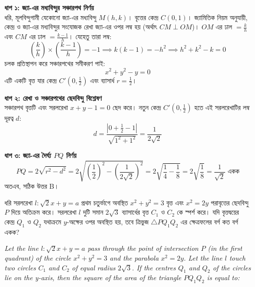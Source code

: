 \documentclass[12pt, a4paper]{article}
\begin{document}
\begin{tcolorbox}[solutionbox={সমাধান (Solution)}]
    \noindent
    \textbf{ধাপ ১: জ্যা-এর মধ্যবিন্দুর সঞ্চারপথ নির্ণয়} \\
    ধরি, মূলবিন্দুগামী যেকোনো জ্যা-এর মধ্যবিন্দু $M(h, k)$। বৃত্তের কেন্দ্র $C(0, 1)$। 
    জ্যামিতিক নিয়ম অনুযায়ী, কেন্দ্র ও জ্যা-এর মধ্যবিন্দুর সংযোজক রেখা জ্যা-এর ওপর লম্ব হয় (অর্থাৎ $CM \perp OM$)। 
    $OM$ এর ঢাল $= \frac{k}{h}$ এবং $CM$ এর ঢাল $= \frac{k - 1}{h}$। যেহেতু তারা লম্ব:
    \[ \left(\frac{k}{h}\right) \times \left(\frac{k - 1}{h}\right) = -1 \implies k(k-1) = -h^2 \implies h^2 + k^2 - k = 0 \]
    চলক প্রতিস্থাপন করে সঞ্চারপথের সমীকরণ পাই: 
    \[ x^2 + y^2 - y = 0 \]
    এটি একটি বৃত্ত যার কেন্দ্র $C'\left(0, \frac{1}{2}\right)$ এবং ব্যাসার্ধ $r = \frac{1}{2}$।
    
    \vspace{0.5em}
    \noindent\textbf{ধাপ ২: রেখা ও সঞ্চারপথের ছেদবিন্দু বিশ্লেষণ} \\
    সঞ্চারপথ বৃত্তটি এবং সরলরেখা $x + y - 1 = 0$ ছেদ করে। নতুন কেন্দ্র $C'\left(0, \frac{1}{2}\right)$ হতে এই সরলরেখাটির লম্ব দূরত্ব $d$:
    \[ d = \frac{\left| 0 + \frac{1}{2} - 1 \right|}{\sqrt{1^2 + 1^2}} = \frac{1}{2\sqrt{2}} \]
    
    \vspace{0.5em}
    \noindent\textbf{ধাপ ৩: জ্যা-এর দৈর্ঘ্য $PQ$ নির্ণয়} \\
    \[ PQ = 2\sqrt{r^2 - d^2} = 2\sqrt{\left(\frac{1}{2}\right)^2 - \left(\frac{1}{2\sqrt{2}}\right)^2} = 2\sqrt{\frac{1}{4} - \frac{1}{8}} = 2\sqrt{\frac{1}{8}} = \frac{1}{\sqrt{2}} \text{ একক} \]
    অতএব, সঠিক উত্তর B।
\end{tcolorbox}

\begin{tcolorbox}[questionbox={প্রশ্ন (Question) 49}]
    \noindent
    ধরি সরলরেখা $l: \sqrt{2}x + y = a$ প্রথম চতুর্ভাগে অবস্থিত $x^2 + y^2 = 3$ বৃত্ত এবং $x^2 = 2y$ পরাবৃত্তের ছেদবিন্দু $P$ দিয়ে অতিক্রম করে। সরলরেখা $l$ দুটি সমান $2\sqrt{3}$ ব্যাসার্ধের বৃত্ত $C_1$ ও $C_2$ কে স্পর্শ করে। যদি বৃত্তদ্বয়ের কেন্দ্র $Q_1$ ও $Q_2$ যথাক্রমে $y$-অক্ষের ওপর অবস্থিত হয়, তবে ত্রিভুজ $\triangle PQ_1Q_2$ এর ক্ষেত্রফলের বর্গ কত বর্গ একক?
    
    \vspace{0.8em}
    \begin{english}
    \noindent\textit{\color{darkgray}
    Let the line $l: \sqrt{2}x + y = a$ pass through the point of intersection $P$ (in the first quadrant) of the circle $x^2 + y^2 = 3$ and the parabola $x^2 = 2y$. Let the line $l$ touch two circles $C_1$ and $C_2$ of equal radius $2\sqrt{3}$. If the centres $Q_1$ and $Q_2$ of the circles lie on the y-axis, then the square of the area of the triangle $PQ_1Q_2$ is equal to:
    }
    \end{english}
\end{tcolorbox}
\end{document}
